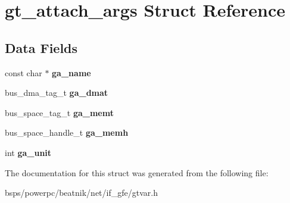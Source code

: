 \hypertarget{structgt__attach__args}{}\section{gt\+\_\+attach\+\_\+args Struct Reference}
\label{structgt__attach__args}
\subsection*{Data Fields}
\begin{DoxyCompactItemize}
\item 
\mbox{\label{structgt__attach__args_a4d5597feecd4fcf5cc43b35ec950227f}} 
const char $\ast$ {\bfseries ga\+\_\+name}
\item 
\mbox{\label{structgt__attach__args_ac1e87df17a94f5f530b783ec7676e9b2}} 
bus\+\_\+dma\+\_\+tag\+\_\+t {\bfseries ga\+\_\+dmat}
\item 
\mbox{\label{structgt__attach__args_a39bb9b9dc64e1940063691c6c5e725f2}} 
bus\+\_\+space\+\_\+tag\+\_\+t {\bfseries ga\+\_\+memt}
\item 
\mbox{\label{structgt__attach__args_ab99eda80a26968b257e0b3e106909b2b}} 
bus\+\_\+space\+\_\+handle\+\_\+t {\bfseries ga\+\_\+memh}
\item 
\mbox{\label{structgt__attach__args_a4b7c8aa3eccba8c1bf223ccc0b826ae8}} 
int {\bfseries ga\+\_\+unit}
\end{DoxyCompactItemize}


The documentation for this struct was generated from the following file\+:\begin{DoxyCompactItemize}
\item 
bsps/powerpc/beatnik/net/if\+\_\+gfe/gtvar.\+h\end{DoxyCompactItemize}
